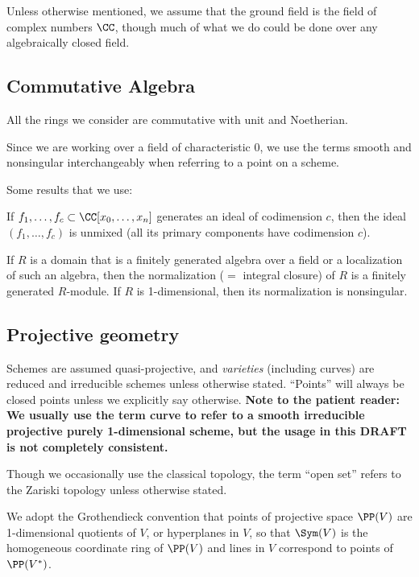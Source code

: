 Unless otherwise mentioned, we assume that the ground field is the field of complex numbers $\CC$, though much of what we do
could be done over any algebraically closed field.

\subsection{Commutative Algebra} 
All the rings we consider are commutative with unit and Noetherian.

Since we are working over  a field of characteristic 0, we use the terms smooth and nonsingular interchangeably when
referring to a point on a scheme.

Some results that we use:
 \begin{theorem}\label{Lasker}
If $f_1,\dots, f_c \subset \CC[x_0,\dots, x_n]$ generates an ideal of codimension $c$, then 
the ideal $(f_1,\dots, f_c)$ is unmixed (all its primary components have codimension $c$).
\end{theorem}

\begin{theorem}\label{finiteness of normalization}
 If $R$ is a domain that is a finitely generated algebra over a field or a localization of such an algebra, then the
normalization ($=$ integral closure) of $R$ is a finitely generated $R$-module.
If $R$ is 1-dimensional, then its normalization is nonsingular.
\end{theorem}

\subsection{Projective geometry}
 
Schemes are assumed quasi-projective, and \emph{varieties} (including curves) are reduced and irreducible schemes unless otherwise stated. ``Points'' will always be closed points unless we explicitly say otherwise. 
{\bf Note to the patient reader: We usually use the term curve to refer to a smooth irreducible projective purely 1-dimensional scheme, but the usage in this DRAFT is not completely consistent.}

Though we occasionally use the classical topology, 
the term ``open set'' refers to the Zariski topology unless otherwise stated.

We adopt the Grothendieck convention that points of projective space $\PP(V)$ are 1-dimensional quotients of $V$, or hyperplanes in $V$, so that
$\Sym(V)$ is the homogeneous coordinate ring of $\PP(V)$ and lines in $V$ correspond to points of $\PP(V^*)$.

